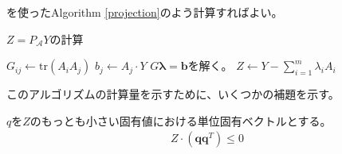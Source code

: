 を使ったAlgorithm \ref{projection}のよう計算すればよい。
\begin{algorithm}
  \caption{$Z = P_\mathcal{A} Y$の計算}
  \label{projection}
  \begin{algorithmic}
    \State $G_{i j} \leftarrow \mathrm{tr}(A_i A_j)$
    \State $b_j \leftarrow A_j \cdot Y$
    \State $G \mathbf{\lambda} = \mathbf{b}$を解く。
    \State \Return $Z \leftarrow Y - \displaystyle{\sum_{i = 1}^m \lambda_i A_i}$
  \end{algorithmic}
\end{algorithm}

このアルゴリズムの計算量を示すために、いくつかの補題を示す。
\begin{lemma*}
  $q$を$Z$のもっとも小さい固有値における単位固有ベクトルとする。
  \begin{align*}
    Z \cdot (\mathbf{q} \mathbf{q}^T) \leq 0
  \end{align*}
\end{lemma*}
